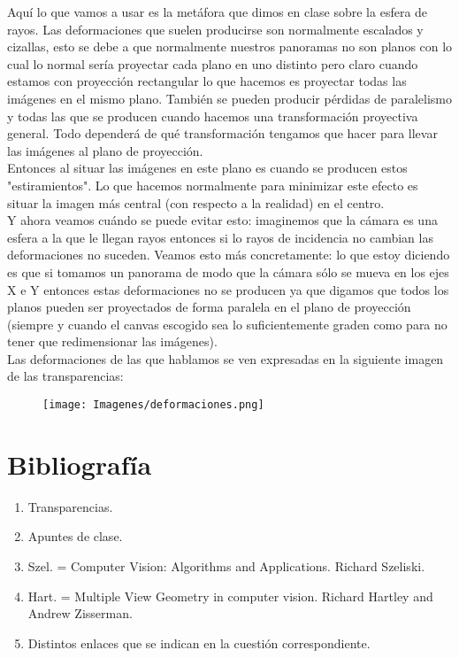 \documentclass[10pt,a4paper]{article}
\begin{document}
Aquí lo que vamos a usar es la metáfora que dimos en clase sobre la esfera de rayos. Las deformaciones que suelen producirse son normalmente escalados y cizallas, esto se debe a que normalmente nuestros panoramas no son planos con lo cual lo normal sería proyectar cada plano en uno distinto pero claro cuando estamos con proyección rectangular lo que hacemos es proyectar todas las imágenes en el mismo plano. También se pueden producir pérdidas de paralelismo y todas las que se producen cuando hacemos una transformación proyectiva general. Todo dependerá de qué transformación tengamos que hacer para llevar las imágenes al plano de proyección.\\

Entonces al situar las imágenes en este plano es cuando se producen estos "estiramientos". Lo que hacemos normalmente para minimizar este efecto es situar la imagen más central (con respecto a la realidad) en el centro.\\

Y ahora veamos cuándo se puede evitar esto: imaginemos que la cámara es una esfera a la que le llegan rayos entonces si lo rayos de incidencia no cambian las deformaciones no suceden. Veamos esto más concretamente: lo que estoy diciendo es que si tomamos un panorama de modo que la cámara sólo se mueva en los ejes X e Y entonces estas deformaciones no se producen ya que digamos que todos los planos pueden ser proyectados de forma paralela en el plano de proyección (siempre y cuando el canvas escogido sea lo suficientemente graden como para no tener que redimensionar las imágenes).\\

Las deformaciones de las que hablamos se ven expresadas en la siguiente imagen de las transparencias:\\

\begin{figure}[H]
\centering
\texttt{[image: Imagenes/deformaciones.png]}
\end{figure}

\section*{Bibliografía}

\begin{enumerate}
\item Transparencias.
\item Apuntes de clase.
\item Szel. = Computer Vision: Algorithms and Applications. Richard Szeliski.
\item Hart. = Multiple View Geometry in computer vision. Richard Hartley and Andrew Zisserman.
\item Distintos enlaces que se indican en la cuestión correspondiente.
\end{enumerate}
\end{document}
